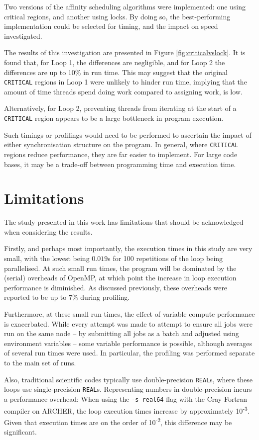\documentclass{article} %
\newcommand{\tp}{\texttt}
\begin{document}
Two versions of the affinity scheduling algorithms were implemented: one using critical regions, and another using locks.
By doing so, the best-performing implementation could be selected for timing, and the impact on speed investigated.

The results of this investigation are presented in Figure \ref{fig:criticalvslock}. 
It is found that, for Loop 1, the differences are negligible, and for Loop 2 the differences are up to 10\% in run time.
This may suggest that the original \tp{CRITICAL} regions in Loop 1 were unlikely to hinder run time, implying that the amount of time threads spend doing work compared to assigning work, is low.

Alternatively, for Loop 2, preventing threads from iterating at the start of a \tp{CRITICAL} region appears to be a large bottleneck in program execution.

Such timings or profilings would need to be performed to ascertain the impact of either synchronisation structure on the program.
In general, where \tp{CRITICAL} regions reduce performance, they are far easier to implement.
For large code bases, it may be a trade-off between programming time and execution time.

\section*{Limitations}

The study presented in this work has limitations that should be acknowledged when considering the results.

Firstly, and perhaps most importantly, the execution times in this study are very small, with the lowest being $0.019$s for 100 repetitions of the loop being parallelised.
At such small run times, the program will be dominated by the (serial) overheads of OpenMP, at which point the increase in loop execution performance is diminished.
As discussed previously, these overheads were reported to be up to $7\%$ during profiling. 

Furthermore, at these small run times, the effect of variable compute performance is exacerbated. 
While every attempt was made to attempt to ensure all jobs were run on the same node -- by submitting all jobs as a batch and adjusted using environment variables -- some variable performance is possible, although averages of several run times were used.
In particular, the profiling was performed separate to the main set of runs.

Also, traditional scientific codes typically use double-precision \tp{REAL}s, where these loops use single-precision \tp{REAL}s.
Representing numbers in double-precision incurs a performance overhead:
When using the \tp{-s real64} flag with the Cray Fortran compiler on ARCHER, the loop execution times increase by approximately 10\textsuperscript{-3}.
Given that execution times are on the order of 10\textsuperscript{-2}, this difference may be significant.
\end{document}

